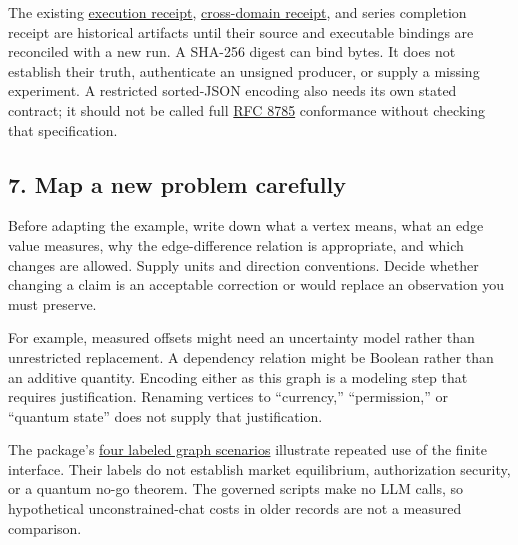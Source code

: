 \documentclass[
  11pt,
]{article}
\begin{document}
The existing
\href{https://github.com/dbccpage/the_symbol_game/blob/52cb5457f6c485ba548cfd292f6012a941ed22cf/atlas/coda_atlas/symbol_game/005_pfp_practitioners_field_manual/code/paper_033_execution_receipt.json}{execution
receipt},
\href{https://github.com/dbccpage/the_symbol_game/blob/52cb5457f6c485ba548cfd292f6012a941ed22cf/atlas/coda_atlas/symbol_game/005_pfp_practitioners_field_manual/code/cross_domain_symbol_game_receipt.json}{cross-domain
receipt}, and series completion receipt are historical artifacts until
their source and executable bindings are reconciled with a new run. A
SHA-256 digest can bind bytes. It does not establish their truth,
authenticate an unsigned producer, or supply a missing experiment. A
restricted sorted-JSON encoding also needs its own stated contract; it
should not be called full
\href{https://www.rfc-editor.org/rfc/rfc8785}{RFC 8785} conformance
without checking that specification.

\subsection{7. Map a new problem
carefully}\label{map-a-new-problem-carefully}

Before adapting the example, write down what a vertex means, what an
edge value measures, why the edge-difference relation is appropriate,
and which changes are allowed. Supply units and direction conventions.
Decide whether changing a claim is an acceptable correction or would
replace an observation you must preserve.

For example, measured offsets might need an uncertainty model rather
than unrestricted replacement. A dependency relation might be Boolean
rather than an additive quantity. Encoding either as this graph is a
modeling step that requires justification. Renaming vertices to
``currency,'' ``permission,'' or ``quantum state'' does not supply that
justification.

The package's
\href{https://github.com/dbccpage/the_symbol_game/blob/52cb5457f6c485ba548cfd292f6012a941ed22cf/atlas/coda_atlas/symbol_game/005_pfp_practitioners_field_manual/code/multi_domain_symbol_game_bouts.py}{four
labeled graph scenarios} illustrate repeated use of the finite
interface. Their labels do not establish market equilibrium,
authorization security, or a quantum no-go theorem. The governed scripts
make no LLM calls, so hypothetical unconstrained-chat costs in older
records are not a measured comparison.
\end{document}
